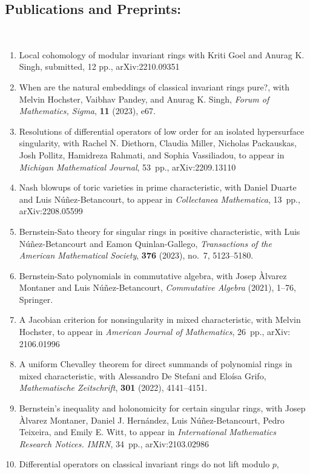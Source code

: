 \documentclass[12pt]{amsart}
\begin{document}
\subsection*{Publications and Preprints:}
\
\begin{enumerate}[leftmargin=9mm]
\item Local cohomology of modular invariant rings
with Kriti Goel and Anurag K. Singh,
submitted, 12 pp., arXiv:2210.09351
\item When are the natural embeddings of classical invariant rings pure?,
with Melvin Hochster, Vaibhav Pandey, and Anurag K. Singh,
\emph{Forum of Mathematics, Sigma}, \textbf{11} (2023), e67.
\item Resolutions of differential operators of low order for an isolated hypersurface singularity,
with Rachel N. Diethorn, Claudia Miller, Nicholas Packauskas, Josh Pollitz, Hamidreza Rahmati, and Sophia Vassiliadou,
to appear in \emph{Michigan Mathematical Journal}, 53~pp., arXiv:2209.13110
\item Nash blowups of toric varieties in prime characteristic, 
with Daniel Duarte and Luis Núñez-Betancourt,
to appear in \emph{Collectanea Mathematica}, 13~pp., arXiv:2208.05599
\item Bernstein-Sato theory for singular rings in positive characteristic, 
with Luis Núñez-Betancourt and Eamon Quinlan-Gallego, 
\emph{Transactions of the American Mathematical Society}, \textbf{376} (2023), no.~7, 5123--5180.
\item Bernstein-Sato polynomials in commutative algebra, 
with Josep \`Alvarez Montaner and Luis N\'u\~nez-Betancourt,
\emph{Commutative Algebra} (2021), 1--76, Springer.
\item A Jacobian criterion for nonsingularity in mixed characteristic, 
with Melvin Hochster,
to appear in \emph{American Journal of Mathematics}, 26~pp., arXiv: 2106.01996
\item A uniform Chevalley theorem for direct summands of polynomial rings in mixed characteristic, 
with Alessandro De Stefani and Elo\'isa Grifo,
\emph{Mathematische Zeitschrift}, \textbf{301} (2022), 4141--4151.
	\item Bernstein's inequality and holonomicity for certain singular rings,
	with Josep Àlvarez Montaner, Daniel J. Hernández, Luis Núñez-Betancourt, Pedro Teixeira, and Emily E. Witt,
to appear in \emph{International Mathematics Research Notices. IMRN}, 34~pp., arXiv:2103.02986
	\item Differential operators on classical invariant rings do not lift modulo $p$,

\end{enumerate}
\end{document}
